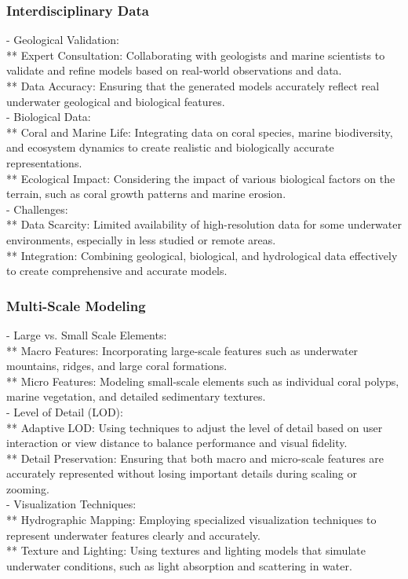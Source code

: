 \subsubsection{Interdisciplinary Data}
- Geological Validation: \\
** Expert Consultation: Collaborating with geologists and marine scientists to validate and refine models based on real-world observations and data. \\
** Data Accuracy: Ensuring that the generated models accurately reflect real underwater geological and biological features. \\
- Biological Data: \\
** Coral and Marine Life: Integrating data on coral species, marine biodiversity, and ecosystem dynamics to create realistic and biologically accurate representations. \\
** Ecological Impact: Considering the impact of various biological factors on the terrain, such as coral growth patterns and marine erosion. \\
- Challenges: \\
** Data Scarcity: Limited availability of high-resolution data for some underwater environments, especially in less studied or remote areas. \\
** Integration: Combining geological, biological, and hydrological data effectively to create comprehensive and accurate models. 

\subsubsection{Multi-Scale Modeling}
- Large vs. Small Scale Elements: \\
** Macro Features: Incorporating large-scale features such as underwater mountains, ridges, and large coral formations. \\
** Micro Features: Modeling small-scale elements such as individual coral polyps, marine vegetation, and detailed sedimentary textures. \\
- Level of Detail (LOD): \\
** Adaptive LOD: Using techniques to adjust the level of detail based on user interaction or view distance to balance performance and visual fidelity. \\
** Detail Preservation: Ensuring that both macro and micro-scale features are accurately represented without losing important details during scaling or zooming. \\
- Visualization Techniques: \\
** Hydrographic Mapping: Employing specialized visualization techniques to represent underwater features clearly and accurately. \\
** Texture and Lighting: Using textures and lighting models that simulate underwater conditions, such as light absorption and scattering in water.

